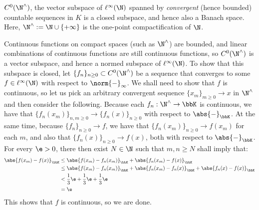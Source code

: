         \begin{example} \label{example: convergent_sequences}
            $C^0(\N^{\wedge})$, the vector subspace of $\ell^{\infty}(\N)$ spanned by \textit{convergent} (hence bounded) countable sequences in $K$ is a closed subspace, and hence also a Banach space. Here, $\N^{\wedge} := \N \cup \{+\infty\}$ is the one-point compactification of $\N$.
            
            Continuous functions on compact spaces (such as $\N^{\wedge}$) are bounded, and linear combinations of continuous functions are still continuous functions, so $C^0(\N^{\wedge})$ is a vector subspace, and hence a normed subspace of $\ell^{\infty}(\N)$. To show that this subspace is closed, let $\{f_n\}_{n \geq 0} \subset C^0(\N^{\wedge})$ be a sequence that converges to some $f \in \ell^{\infty}(\N)$ with respect to $\norm{-}_{\infty}$. We shall need to show that $f$ is continuous, so let us pick an arbitrary convergent sequence $\{x_m\}_{m \geq 0} \to x$ in $\N^{\wedge}$ and then consider the following. Because each $f_n: \N^{\wedge} \to \bbK$ is continuous, we have that $\{f_n(x_m)\}_{n, m \geq 0} \to \{f_n(x)\}_{n \geq 0}$ with respect to $\abs{-}_{\bbK}$. At the same time, because $\{f_n\}_{n \geq 0} \to f$, we have that $\{f_n(x_m)\}_{n \geq 0} \to f(x_m)$ for each $m$, and also that $\{f_n(x)\}_{n \geq 0} \to f(x)$, both with respect to $\abs{-}_{\bbK}$. For every $\e > 0$, there then exist $N \in \N$ such that $m, n \geq N$ shall imply that:
                $$
                    \begin{aligned}
                        \abs{f(x_m) - f(x)}_{\bbK} & \leq \abs{ f(x_m) - f_n(x_m) }_{\bbK} + \abs{f_n(x_m) - f(x)}_{\bbK}
                        \\
                        & \leq \abs{ f(x_m) - f_n(x_m) }_{\bbK} + \abs{f_n(x_m) - f_n(x)}_{\bbK} + \abs{f_n(x) - f(x)}_{\bbK}
                        \\
                        & < \frac13 \e + \frac13 \e + \frac13 \e
                        \\
                        & = \e
                    \end{aligned}
                $$
            This shows that $f$ is continuous, so we are done.
        \end{example}
        \begin{example} \label{example: sequences_converging_to_zero}
            
        \end{example}
        \begin{example} \label{example: eventually_zero_sequences}
            
        \end{example}

